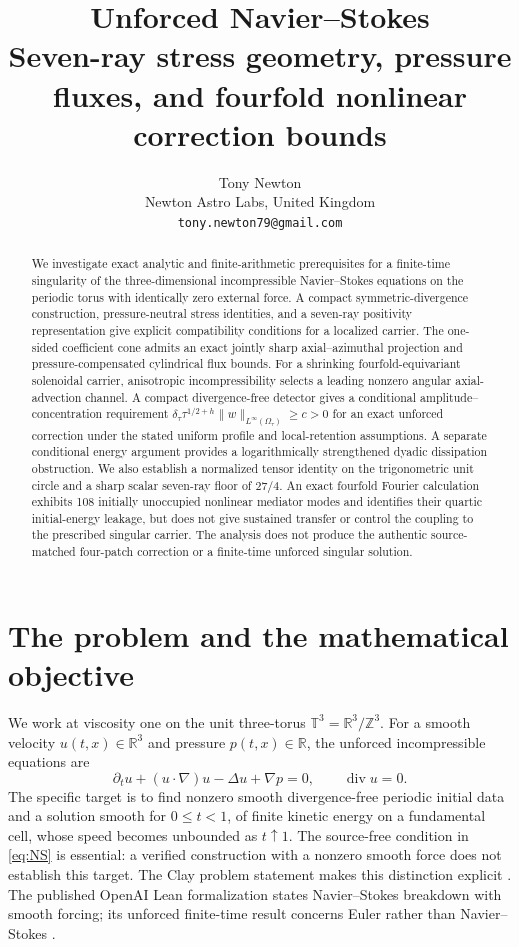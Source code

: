 \documentclass[11pt,a4paper]{article}
\title{\vspace{-1.2em}\bfseries\LARGE Unforced Navier--Stokes\\[0.45em]
  \large\mdseries Seven-ray stress geometry, pressure fluxes, and fourfold nonlinear correction bounds}
\author{Tony Newton\\\small Newton Astro Labs, United Kingdom\\
  \small\texttt{tony.newton79@gmail.com}}
\date{}
\theoremstyle{plain}
\theoremstyle{definition}
\newcommand{\R}{\mathbb{R}}
\newcommand{\T}{\mathbb{T}^{3}}
\newcommand{\diver}{\operatorname{div}}
\begin{document}
\maketitle
\thispagestyle{plain}
\begin{abstract}
We investigate exact analytic and finite-arithmetic prerequisites for a
finite-time singularity of the three-dimensional incompressible Navier--Stokes
equations on the periodic torus with identically zero external force.
A compact symmetric-divergence construction, pressure-neutral stress
identities, and a seven-ray positivity representation give explicit
compatibility conditions for a localized carrier. The one-sided
coefficient cone admits an exact jointly sharp axial--azimuthal
projection and pressure-compensated cylindrical flux bounds.
For a shrinking fourfold-equivariant solenoidal carrier, anisotropic
incompressibility selects a leading nonzero angular axial-advection
channel. A compact divergence-free detector gives a conditional
amplitude--concentration requirement
\(\delta_\tau\tau^{1/2+h}\|w\|_{L^\infty(\Omega_\tau)}\geq c>0\)
for an exact unforced correction under the stated uniform profile
and local-retention assumptions. A separate conditional
energy argument provides a logarithmically strengthened dyadic
dissipation obstruction. We also establish a normalized tensor identity
on the trigonometric unit circle and a sharp scalar seven-ray floor
of \(27/4\). An exact fourfold Fourier calculation exhibits 108 initially
unoccupied nonlinear mediator modes and identifies their quartic
initial-energy leakage, but does not give sustained transfer or control
the coupling to the prescribed singular carrier.
The analysis does not produce the authentic source-matched
four-patch correction or a finite-time unforced singular solution.
\end{abstract}

\section{The problem and the mathematical objective}

We work at viscosity one on the unit three-torus
$\T=\R^{3}/\mathbb{Z}^{3}$. For a smooth velocity $u(t,x)\in\R^{3}$
and pressure $p(t,x)\in\R$, the unforced incompressible equations are
\begin{equation}\label{eq:NS}
  \partial_tu+(u\cdot\nabla)u-\Delta u+\nabla p=0,
  \qquad \diver u=0.
\end{equation}
The specific target is to find nonzero smooth divergence-free periodic
initial data and a solution smooth for $0\le t<1$, of finite kinetic
energy on a fundamental cell, whose speed becomes unbounded as $t\uparrow1$.
The source-free condition in \eqref{eq:NS} is essential: a verified
construction with a nonzero smooth force does not establish this target.
The Clay problem statement makes this distinction explicit
\cite{Fefferman2000}. The published OpenAI Lean formalization states
Navier--Stokes breakdown with smooth forcing; its unforced finite-time
result concerns Euler rather than Navier--Stokes \cite{OpenAI2026}.
\end{document}
